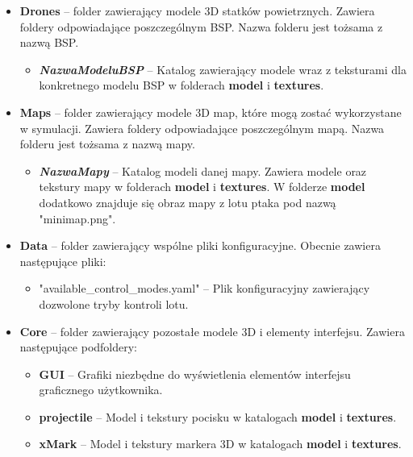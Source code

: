 \documentclass[15pt]{sprawozdanie}
\begin{document}
\begin{itemize}

\item \textbf{Drones} -- folder zawierający modele 3D statków powietrznych. Zawiera foldery odpowiadające poszczególnym BSP. Nazwa folderu jest tożsama z nazwą BSP.
\begin{itemize}
\item \textbf{\textbf{\textit{NazwaModeluBSP}}} -- Katalog zawierający modele wraz z teksturami dla konkretnego modelu BSP w folderach \textbf{model} i \textbf{textures}.
\end{itemize}

\item \textbf{Maps} -- folder zawierający modele 3D map, które mogą zostać wykorzystane w symulacji. Zawiera foldery odpowiadające poszczególnym mapą. Nazwa folderu jest tożsama z nazwą mapy.
\begin{itemize}
	\item \textbf{\textbf{\textit{NazwaMapy}}} -- Katalog modeli danej mapy. Zawiera modele oraz tekstury mapy w folderach \textbf{model} i \textbf{textures}. W folderze \textbf{model} dodatkowo znajduje się obraz mapy z lotu ptaka pod nazwą "minimap.png".
\end{itemize}

\item \textbf{Data} -- folder zawierający wspólne pliki konfiguracyjne. Obecnie zawiera następujące pliki:
\begin{itemize}
	\item "available\_control\_modes.yaml" -- Plik konfiguracyjny zawierający dozwolone tryby kontroli lotu.
\end{itemize}

\item \textbf{Core} -- folder zawierający pozostałe modele 3D i elementy interfejsu. Zawiera następujące podfoldery:
\begin{itemize}
	\item \textbf{GUI} -- Grafiki niezbędne do wyświetlenia elementów interfejsu graficznego użytkownika.
	\item \textbf{projectile} -- Model i tekstury pocisku w katalogach \textbf{model} i \textbf{textures}.
	\item \textbf{xMark} -- Model i tekstury markera 3D w katalogach \textbf{model} i \textbf{textures}.
\end{itemize}

\end{itemize}
\end{document}
